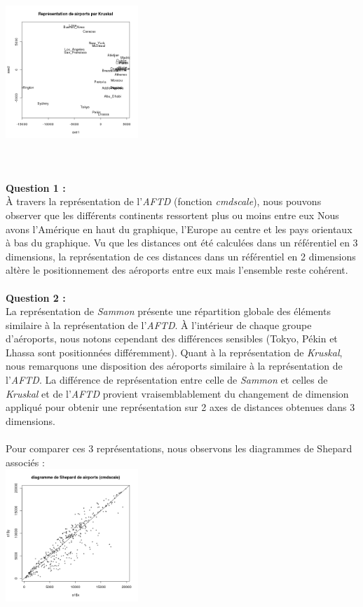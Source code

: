 \documentclass[a4paper, 10pt]{article}
\begin{document}
\includegraphics[height = 7cm, width = 5cm]{plots/plot_airports_kruskal.png}\\ \\
\textbf{Question 1 :}\\
À travers la représentation de l'\textit{AFTD} (fonction \textit{cmdscale}), nous pouvons observer que les différents continents ressortent plus ou moins
entre eux
Nous avons l'Amérique en haut du graphique, l'Europe au centre et les pays orientaux à bas du graphique.
Vu que les distances ont été calculées dans un référentiel en 3 dimensions, la représentation de ces distances dans un référentiel en 2 dimensions
altère le positionnement des aéroports entre eux mais l'ensemble reste cohérent.\\ \\
\textbf{Question 2 :}\\
La représentation de \textit{Sammon} présente une répartition globale des éléments similaire à la représentation de l'\textit{AFTD}.
À l'intérieur de chaque groupe d'aéroports, nous notons cependant des différences sensibles (Tokyo, Pékin et Lhassa sont positionnées
différemment).
Quant à la représentation de \textit{Kruskal}, nous remarquons une disposition des aéroports similaire à la représentation de l'\textit{AFTD}.
La différence de représentation entre celle de \textit{Sammon} et celles de \textit{Kruskal} et de l'\textit{AFTD} provient vraisemblablement
du changement de dimension appliqué pour obtenir une représentation sur 2 axes de distances obtenues dans 3 dimensions.\\ \\
Pour comparer ces 3 représentations, nous observons les diagrammes de Shepard associés :\\
\includegraphics[height = 5cm, width = 5cm]{plots/plot_airports_shepard_cmdscale.png}
\end{document}
